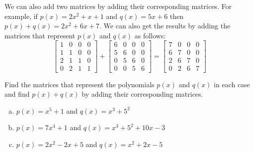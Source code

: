 \begin{example}{}
We can also add two matrices by adding their corresponding matrices. For example, if $p(x)=2x^2+x+1$ and $q(x)=5x+6$ then $p(x)+q(x)=2x^2+6x+7$. We can also get the results by adding the matrices that represent $p(x)$ and $q(x)$ as follows:\\
\[\left[\begin{array}{cccc}1 & 0 & 0 & 0\\1 & 1 & 0 & 0\\2 & 1 & 1 & 0\\0 & 2 & 1 & 1\end{array}\right]+\left[\begin{array}{cccc}6 & 0 & 0 & 0\\5 & 6 & 0 & 0\\0 & 5 & 6 & 0\\0 & 0 & 5 & 6\end{array}\right]=\left[\begin{array}{cccc}7 & 0 & 0 & 0\\6 & 7 & 0 & 0\\2 & 6 & 7 & 0\\0 & 2 & 6 & 7\end{array}\right]\]
\end{example}

\begin{exercise}{}
Find the matrices that represent the polynomials $p(x)$ and $q(x)$ in each case and find $p(x)+q(x)$ by adding their corresponding matrices.
	\begin{enumerate}[(a)]
		\item
		$p(x)=x^5+1$ and $q(x)=x^3+5^2$
		\item
		$p(x)=7x^4+1$ and $q(x)=x^3+5^2+10x-3$
		\item
		$p(x)=2x^2-2x+5$ and $q(x)=x^2+2x-5$
	\end{enumerate}
\end{exercise}

